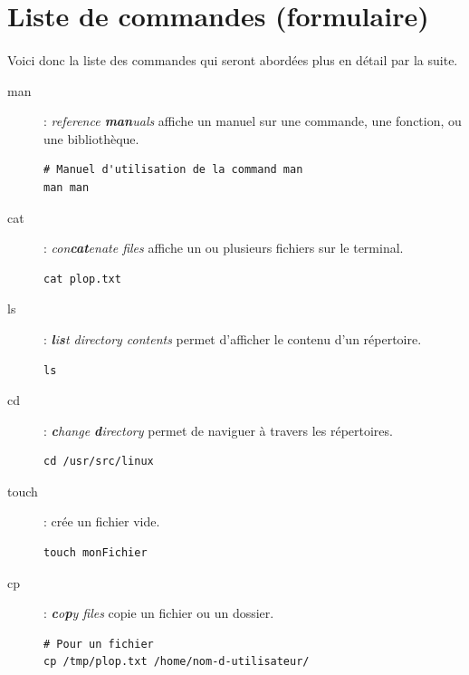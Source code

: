 \documentclass[french, a4paper, 12pt, titlepage]{article}
\begin{document}
\section{Liste de commandes (formulaire)}

\paragraph{} Voici donc la liste des commandes qui seront abordées plus en
détail par la suite.

\begin{description}
\item[man]: \emph{reference \textbf{man}uals} affiche un manuel sur une
	commande, une fonction, ou une bibliothèque.

  \begin{lstlisting}
# Manuel d'utilisation de la command man
man man
  \end{lstlisting}

\item[cat]: \emph{con\textbf{cat}enate files} affiche un ou plusieurs fichiers
	sur le terminal.

  \begin{lstlisting}
cat plop.txt
  \end{lstlisting}

\item[ls]: \emph{\textbf{l}i\textbf{s}t directory contents} permet d'afficher
	le contenu d'un répertoire.

  \begin{lstlisting}
ls
  \end{lstlisting}

\item[cd]: \emph{\textbf{c}hange \textbf{d}irectory} permet de naviguer à
	travers les répertoires.

  \begin{lstlisting}
cd /usr/src/linux
  \end{lstlisting}

\item[touch]: crée un fichier vide.

  \begin{lstlisting}
touch monFichier
  \end{lstlisting}

\item[cp]: \emph{\textbf{c}o\textbf{p}y files} copie un fichier ou un dossier.

  \begin{lstlisting}
# Pour un fichier
cp /tmp/plop.txt /home/nom-d-utilisateur/
  \end{lstlisting}


\end{description}
\end{document}
